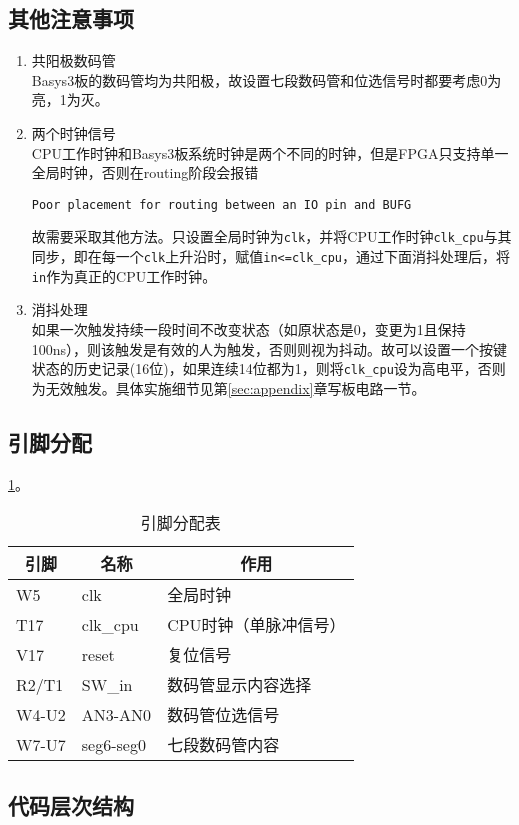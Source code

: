 \subsection{其他注意事项}
\begin{enumerate}
    \item 共阳极数码管\\
    Basys3板的数码管均为共阳极，故设置七段数码管和位选信号时都要考虑0为亮，1为灭。
    \item 两个时钟信号\\%
    CPU工作时钟和Basys3板系统时钟是两个不同的时钟，但是FPGA只支持单一全局时钟，否则在routing阶段会报错
    \begin{center}\verb'Poor placement for routing between an IO pin and BUFG'\end{center}
    故需要采取其他方法。只设置全局时钟为\verb'clk'，并将CPU工作时钟\verb'clk_cpu'与其同步，即在每一个\verb'clk'上升沿时，赋值\verb'in<=clk_cpu'，通过下面消抖处理后，将\verb'in'作为真正的CPU工作时钟。
    \item 消抖处理\\
    如果一次触发持续一段时间不改变状态（如原状态是0，变更为1且保持100ns），则该触发是有效的人为触发，否则则视为抖动。故可以设置一个按键状态的历史记录(16位)，如果连续14位都为1，则将\verb'clk_cpu'设为高电平，否则为无效触发。具体实施细节见第\ref{sec:appendix}章写板电路一节。
\end{enumerate}

\subsection{引脚分配}
\ref{tab:pin}。
\begin{table}[htbp]
  \centering\wuhao
  \caption{引脚分配表}
    \begin{tabular}{|l|l|l|}
    \hline
    \multicolumn{1}{|c|}{引脚} & \multicolumn{1}{c|}{名称} & \multicolumn{1}{c|}{作用} \bigstrut\\
    \hline
    W5    & clk   & 全局时钟 \bigstrut\\
    \hline
    T17   & clk\_cpu & CPU时钟（单脉冲信号） \bigstrut\\
    \hline
    V17   & reset & 复位信号 \bigstrut\\
    \hline
    R2/T1 & SW\_in & 数码管显示内容选择 \bigstrut\\
    \hline
    W4-U2 & AN3-AN0 & 数码管位选信号 \bigstrut\\
    \hline
    W7-U7 & seg6-seg0 & 七段数码管内容 \bigstrut\\
    \hline
    \end{tabular}%
  \label{tab:pin}%
\end{table}%

\subsection{代码层次结构}

